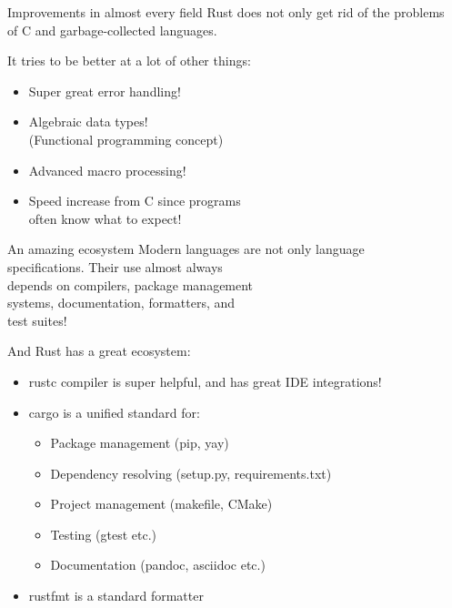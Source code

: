 \documentclass[usenames,dvipsnames,10pt,aspectratio=169]{beamer}
\begin{document}
\begin{frame}{Improvements in almost every field} 
	\large
Rust does not only get rid of the problems\\
of C and garbage-collected languages.
\vspace{0.3cm}

It tries to be better at a lot of other things:
\begin{itemize}
	\item Super great error handling!
	\item Algebraic data types!\\
		(Functional programming concept)
	\item Advanced macro processing!
	\item Speed increase from C since programs \\
		often know what to expect!
\end{itemize}
\end{frame}

\begin{frame}{An amazing ecosystem} 
Modern languages are not only language\\
specifications. Their use almost always\\
depends on compilers, package management\\
systems, documentation, formatters, and\\
test suites!
\vspace{0.25cm}

\large
And Rust has a great ecosystem:
\begin{itemize}
	\item rustc compiler is super helpful, and has great IDE integrations!
	\item cargo is a unified standard for:
		\begin{itemize}
			\item Package management (pip, yay)
			\item Dependency resolving (setup.py, requirements.txt)
			\item Project management (makefile, CMake)
			\item Testing (gtest etc.)
			\item Documentation (pandoc, asciidoc etc.)
		\end{itemize}
	\item rustfmt is a standard formatter
\end{itemize}
\vspace{0.55cm}
\end{frame}
\end{document}
